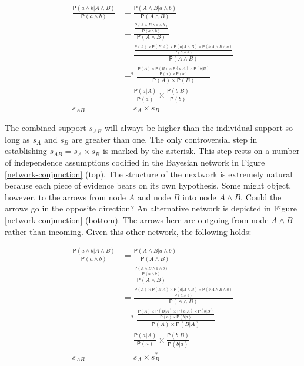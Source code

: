 \documentclass[10pt,dvipsnames,enabledeprecatedfontcommands]{scrartcl}
\newcommand{\et}{\wedge}
\newcommand{\pr}[1]{\mathsf{P}(#1)}
\begin{document}
\begin{align*}
\frac{\pr{a \wedge b| A\wedge B}}{\pr{a \wedge b}} & =  \frac{\pr{A \et B| a\wedge b}}{\pr{A \et B}}\\
& =  \frac{\frac{ \pr{A \et B \et a \wedge b }}{\pr{a \et b}}}{\pr{A \et B}} \\ 
& =  \frac{\frac{ \pr{A} \times \pr{B|A} \times \pr{a | A \wedge B} \times \pr{b | A \wedge B \wedge a}}{\pr{a \et b}}}{\pr{A \et B}} \\ 
& =^*  \frac{\frac{\pr{A} \times \pr{B} \times \pr{a | A} \times \pr{b | B}}{\pr{a} \times \pr{b}}}{\pr{A} \times \pr{B}} \\ 
& =  \frac{\pr{a |A}}{\pr{a}} \times \frac{\pr{b |B}}{\pr{b}} \\
s_{AB}& =  s_{A}\times s_{B} 
 \end{align*}

\noindent  The combined support \(s_{AB}\) will always be higher than
the individual support so long as \(s_{A}\) and \(s_{B}\) are greater
than one. The only controversial step in establishing
\(s_{AB} = s_{A}\times s_{B}\) is marked by the asterisk. This step
rests on a number of independence assumptions codified in the Bayesian
network in Figure \ref{network-conjunction} (top).
 The structure of the nextwork is extremely
natural because each piece of evidence bears on its own hypothesis. Some
might object, however, to the arrows from node \(A\) and node \(B\) into
node \(A \wedge B\). Could the arrows go in the opposite direction? An
alternative network is depicted in Figure \ref{network-conjunction}
(bottom). The arrows here are outgoing from node \(A \wedge B\) rather
than incoming. Given this other network, the following holds:

\begin{align*}
\frac{\pr{a \wedge b| A\wedge B}}{\pr{a \wedge b}} & =  \frac{\pr{A \et B| a\wedge b}}{\pr{A \et B}}\\
& =  \frac{\frac{ \pr{A \et B \et a \wedge b }}{\pr{a \et b}}}{\pr{A \et B}} \\ 
& =  \frac{\frac{ \pr{A} \times \pr{B|A} \times \pr{a | A \wedge B} \times \pr{b | A \wedge B \wedge a} }{\pr{a \et b}}}{\pr{A \et B}} \\ 
& =^*  \frac{\frac{\pr{A} \times \pr{B|A} \times \pr{a | A} \times \pr{b | B}}{\pr{a} \times \pr{b |a}}}{\pr{A} \times \pr{B | A}} \\ 
& =  \frac{\pr{a |A}}{\pr{a}} \times \frac{\pr{b |B}}{\pr{b|a}} \\
s_{AB}& =  s_{A}\times s^{*}_{B} 
 \end{align*}
\end{document}
